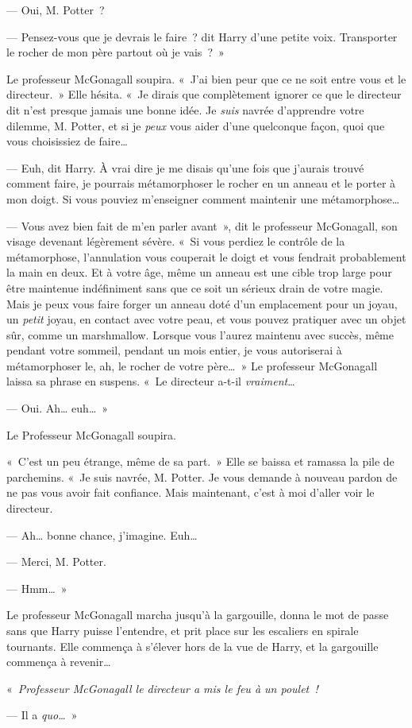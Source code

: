 --- Oui, M. Potter~?

--- Pensez-vous que je devrais le faire~? dit Harry d'une petite voix.
Transporter le rocher de mon père partout où je vais~?~»

Le professeur McGonagall soupira.
«~J'ai bien peur que ce ne soit entre vous et le directeur.~»
Elle hésita.
«~Je dirais que complètement ignorer ce que le directeur dit n'est presque jamais une bonne idée.
Je \emph{suis} navrée d'apprendre votre dilemme, M. Potter, et si je \emph{peux} vous aider d'une quelconque façon, quoi que vous choisissiez de faire…

--- Euh, dit Harry.
À vrai dire je me disais qu'une fois que j'aurais trouvé comment faire, je pourrais métamorphoser le rocher en un anneau et le porter à mon doigt.
Si vous pouviez m'enseigner comment maintenir une métamorphose…

--- Vous avez bien fait de m'en parler avant~», dit le professeur McGonagall, son visage devenant légèrement sévère.
«~Si vous perdiez le contrôle de la métamorphose, l'annulation vous couperait le doigt et vous fendrait probablement la main en deux.
Et à votre âge, même un anneau est une cible trop large pour être maintenue indéfiniment sans que ce soit un sérieux drain de votre magie.
Mais je peux vous faire forger un anneau doté d'un emplacement pour un joyau, un \emph{petit} joyau, en contact avec votre peau, et vous pouvez pratiquer avec un objet sûr, comme un marshmallow.
Lorsque vous l'aurez maintenu avec succès, même pendant votre sommeil, pendant un mois entier, je vous autoriserai à métamorphoser le, ah, le rocher de votre père…~»
Le professeur McGonagall laissa sa phrase en suspens.
«~Le directeur a-t-il \emph{vraiment}…

--- Oui.
Ah… euh…~»

Le Professeur McGonagall soupira.

«~C'est un peu étrange, même de sa part.~»
Elle se baissa et ramassa la pile de parchemins.
«~Je suis navrée, M. Potter.
Je vous demande à nouveau pardon de ne pas vous avoir fait confiance.
Mais maintenant, c'est à moi d'aller voir le directeur.

--- Ah… bonne chance, j'imagine.
Euh…

--- Merci, M. Potter.

--- Hmm…~»

Le professeur McGonagall marcha jusqu'à la gargouille, donna le mot de passe sans que Harry puisse l'entendre, et prit place sur les escaliers en spirale tournants.
Elle commença à s'élever hors de la vue de Harry, et la gargouille commença à revenir…

«~\emph{Professeur McGonagall le directeur a mis le feu à un poulet~!}

--- Il a \emph{quo…}~»
